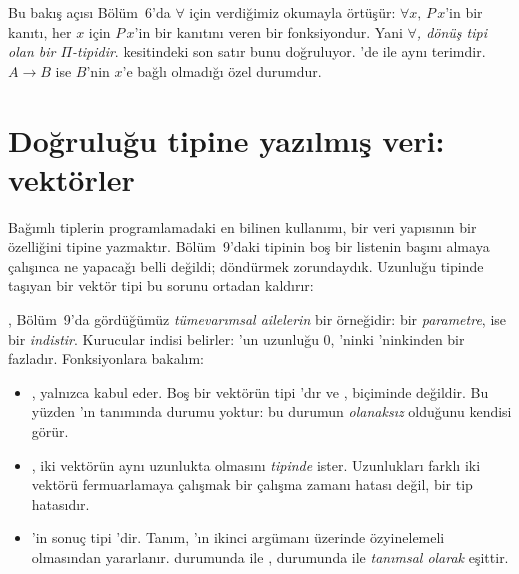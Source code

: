 \noindent Bu bakış açısı Bölüm~6'da $\forall$ için verdiğimiz okumayla
örtüşür: $\forall x,\, P\,x$'in bir kanıtı, her $x$ için $P\,x$'in bir
kanıtını veren bir fonksiyondur. Yani \emph{$\forall$, dönüş tipi
 olan bir $Π$-tipidir}.  kesitindeki son satır bunu
doğruluyor. \Lean{}'de  ile  aynı
terimdir. $A \to B$ ise $B$'nin $x$'e bağlı olmadığı özel durumdur.

\section{Doğruluğu tipine yazılmış veri: vektörler}\label{sec:vektor}

Bağımlı tiplerin programlamadaki en bilinen kullanımı, bir veri yapısının
bir özelliğini tipine yazmaktır. Bölüm~9'daki  tipinin boş bir
listenin başını almaya çalışınca ne yapacağı belli değildi; 
döndürmek zorundaydık. Uzunluğu tipinde taşıyan bir vektör tipi bu
sorunu ortadan kaldırır:


\noindent {}, Bölüm~9'da gördüğümüz \emph{tümevarımsal
ailelerin} bir örneğidir:  bir \emph{parametre},  ise bir
\emph{indistir}. Kurucular indisi belirler: 'un uzunluğu 0,
'ninki 'ninkinden bir fazladır. Fonksiyonlara
bakalım:

\begin{itemize}
  \item {}, yalnızca  kabul eder. Boş bir vektörün
        tipi 'dır ve ,  biçiminde değildir.
        Bu yüzden 'ın tanımında  durumu yoktur: \Lean{} bu
        durumun \emph{olanaksız} olduğunu kendisi görür.
  \item {}, iki vektörün aynı uzunlukta olmasını \emph{tipinde}
        ister. Uzunlukları farklı iki vektörü fermuarlamaya çalışmak bir
        çalışma zamanı hatası değil, bir tip hatasıdır.
  \item {}'in sonuç tipi 'dir. Tanım,
        'ın ikinci argümanı üzerinde özyinelemeli olmasından
        yararlanır.  durumunda  ile , 
        durumunda  ile  \emph{tanımsal
        olarak} eşittir.
\end{itemize}

